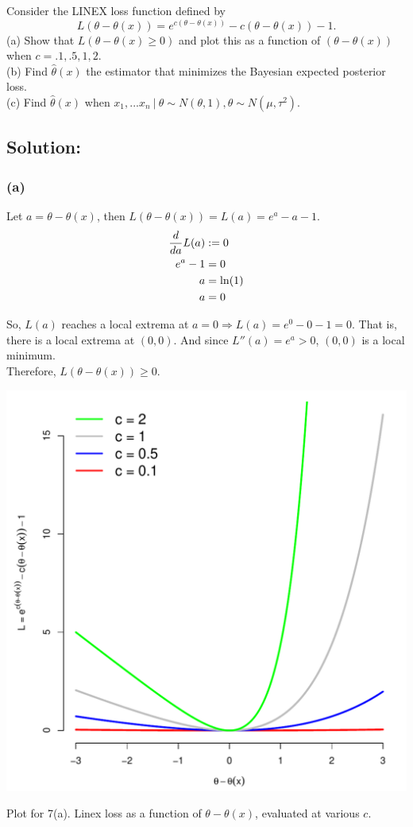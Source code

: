 \def\mya{\theta-\theta(x)}
\def\linex{e^{c(\mya)} - c(\mya) -1}

Consider the LINEX loss function defined by 
\[
  L(\mya) = \linex.
\]
(a) Show that $L(\mya \ge 0)$ and plot this as a function of $(\mya)$ when $c= .1, .5, 1, 2$.\\
(b) Find $\hat\theta(x)$ the estimator that minimizes the Bayesian expected posterior loss.\\
(c) Find $\hat\theta(x)$ when $x_1,...x_n~|~\theta \sim N(\theta,1), \theta \sim N(\mu,\tau^2)$.

\subsection*{Solution:}
\subsubsection*{(a)}
Let $a = \mya$, then $L(\mya) = L(a) = e^a - a - 1$. 
\begin{align*}
  \displaystyle{{d}\over{d a}} L(a) &:= 0 \\
  e^a - 1 &= 0 \\
  a &= \ln(1) \\
  a &= 0 \\
\end{align*}

\noindent
So, $L(a)$ reaches a local extrema at $a=0 \Rightarrow L(a) = e^0 - 0 - 1 = 0$. 
That is, there is a local extrema at $(0,0)$.
And since $L''(a) = e^a > 0$, $(0,0)$ is a local minimum.\\

\noindent
Therefore, $L(\mya) \geq 0$.

\beginmyfig
\includegraphics[scale=.7]{../img/fig1.pdf}
\caption{Plot for 7(a). Linex loss as a function of $\theta - \theta(x)$, evaluated at various $c$.}
\endmyfig

